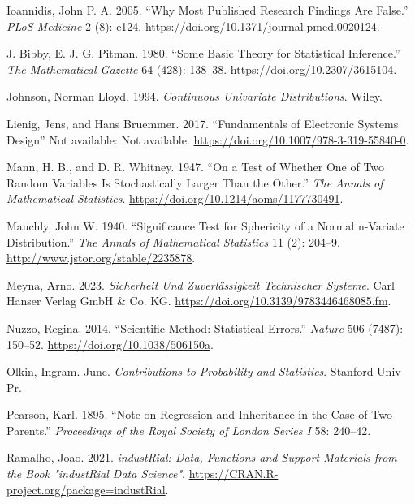 \documentclass[
  a4paper,
]{scrbook}
\newlength{\cslhangindent}
\newenvironment{CSLReferences}[2] %
 {\begin{list}{}{%
  \setlength{\itemindent}{0pt}
  \setlength{\leftmargin}{0pt}
  \setlength{\parsep}{0pt}
  \ifodd #1
   \setlength{\leftmargin}{\cslhangindent}
   \setlength{\itemindent}{-1\cslhangindent}
  \fi
  \setlength{\itemsep}{#2\baselineskip}}}
 {\end{list}}
\begin{document}
\begin{CSLReferences}{1}{0}
Ioannidis, John P. A. 2005. {``Why Most Published Research Findings Are
False.''} \emph{{PLoS} Medicine} 2 (8): e124.
\url{https://doi.org/10.1371/journal.pmed.0020124}.

J. Bibby, E. J. G. Pitman. 1980. {``Some Basic Theory for Statistical
Inference.''} \emph{The Mathematical Gazette} 64 (428): 138--38.
\url{https://doi.org/10.2307/3615104}.

Johnson, Norman Lloyd. 1994. \emph{Continuous Univariate Distributions}.
Wiley.

Lienig, Jens, and Hans Bruemmer. 2017. {``Fundamentals of Electronic
Systems Design''} Not available: Not available.
\url{https://doi.org/10.1007/978-3-319-55840-0}.

Mann, H. B., and D. R. Whitney. 1947. {``On a Test of Whether One of Two
Random Variables Is Stochastically Larger Than the Other.''} \emph{The
Annals of Mathematical Statistics}.
\url{https://doi.org/10.1214/aoms/1177730491}.

Mauchly, John W. 1940. {``Significance Test for Sphericity of a Normal
n-Variate Distribution.''} \emph{The Annals of Mathematical Statistics}
11 (2): 204--9. \url{http://www.jstor.org/stable/2235878}.

Meyna, Arno. 2023. \emph{Sicherheit Und Zuverlässigkeit Technischer
Systeme}. Carl Hanser Verlag {GmbH} {\&} Co. {KG}.
\url{https://doi.org/10.3139/9783446468085.fm}.

Nuzzo, Regina. 2014. {``Scientific Method: Statistical Errors.''}
\emph{Nature} 506 (7487): 150--52.
\url{https://doi.org/10.1038/506150a}.

Olkin, Ingram. June. \emph{Contributions to Probability and Statistics}.
Stanford Univ Pr.

Pearson, Karl. 1895. {``Note on Regression and Inheritance in the Case
of Two Parents.''} \emph{Proceedings of the Royal Society of London
Series I} 58: 240--42.

Ramalho, Joao. 2021. \emph{industRial: Data, Functions and Support
Materials from the Book "industRial Data Science"}.
\url{https://CRAN.R-project.org/package=industRial}.


\end{CSLReferences}
\end{document}
